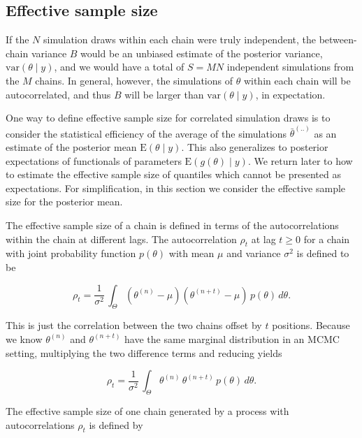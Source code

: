 \documentclass[american,]{article}
\begin{document}
\hypertarget{ESS}{%
\subsection{Effective sample size}\label{ESS}}

If the \(N\) simulation draws within each chain were truly independent,
the between-chain variance \(B\) would be an unbiased estimate of the
posterior variance, \(\mbox{var}(\theta \mid y)\), and we would have a
total of \(S = MN\) independent simulations from the \(M\) chains. In
general, however, the simulations of \(\theta\) within each chain will
be autocorrelated, and thus \(B\) will be larger than
\(\mbox{var}(\theta \mid y)\), in expectation.

One way to define effective sample size for correlated simulation draws
is to consider the statistical efficiency of the average of the
simulations \(\bar{\theta}^{(..)}\) as an estimate of the posterior mean
\(\mbox{E}(\theta \mid y)\). This also generalizes to posterior
expectations of functionals of parameters \(\mbox{E}(g(\theta) \mid y)\).
We return later to how to estimate the effective sample size of
quantiles which cannot be presented as expectations. For simplification,
in this section we consider the effective sample size for the posterior
mean.

The effective sample size of a chain is defined in terms of the
autocorrelations within the chain at different lags. The autocorrelation
\(\rho_t\) at lag \(t \geq 0\) for a chain with joint probability
function \(p(\theta)\) with mean \(\mu\) and variance \(\sigma^2\) is
defined to be

\begin{equation}
\rho_t = \frac{1}{\sigma^2} \, \int_{\Theta} (\theta^{(n)} - \mu)
(\theta^{(n+t)} - \mu) \, p(\theta) \, d \theta.
\end{equation}

This is just the correlation between the two chains offset by \(t\)
positions. Because we know \(\theta^{(n)}\) and \(\theta^{(n+t)}\) have
the same marginal distribution in an MCMC setting, multiplying the two
difference terms and reducing yields

\begin{equation}
\rho_t = \frac{1}{\sigma^2} \, \int_{\Theta} \theta^{(n)} \, \theta^{(n+t)}
\, p(\theta) \, d \theta.
\end{equation}

The effective sample size of one chain generated by a process with
autocorrelations \(\rho_t\) is defined by
\end{document}
